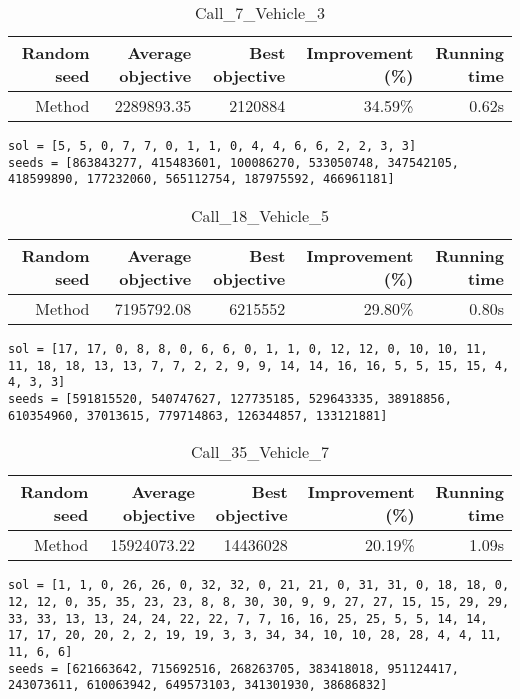 \begin{table}[ht]
\centering
\caption{Call\_7\_Vehicle\_3}
\label{tab:call7vehicle3}
\begin{tabular}{|r|r|r|r|r|}
Random seed & Average objective & Best objective & Improvement (\%) & Running time \\
\hline
Method & 2289893.35 & 2120884 & 34.59\% & 0.62s\\
\end{tabular}
\end{table}
\begin{lstlisting}[label={lst:call7vehicle3},caption=Optimal solution call\_7\_vehicle\_3]
sol = [5, 5, 0, 7, 7, 0, 1, 1, 0, 4, 4, 6, 6, 2, 2, 3, 3]
seeds = [863843277, 415483601, 100086270, 533050748, 347542105, 418599890, 177232060, 565112754, 187975592, 466961181]
\end{lstlisting}
\clearpage


\begin{table}[ht]
\centering
\caption{Call\_18\_Vehicle\_5}
\label{tab:call18vehicle5}
\begin{tabular}{|r|r|r|r|r|}
Random seed & Average objective & Best objective & Improvement (\%) & Running time \\
\hline
Method & 7195792.08 & 6215552 & 29.80\% & 0.80s\\
\end{tabular}
\end{table}
\begin{lstlisting}[label={lst:call18vehicle5},caption=Optimal solution call\_18\_vehicle\_5]
sol = [17, 17, 0, 8, 8, 0, 6, 6, 0, 1, 1, 0, 12, 12, 0, 10, 10, 11, 11, 18, 18, 13, 13, 7, 7, 2, 2, 9, 9, 14, 14, 16, 16, 5, 5, 15, 15, 4, 4, 3, 3]
seeds = [591815520, 540747627, 127735185, 529643335, 38918856, 610354960, 37013615, 779714863, 126344857, 133121881]
\end{lstlisting}
\clearpage


\begin{table}[ht]
\centering
\caption{Call\_35\_Vehicle\_7}
\label{tab:call35vehicle7}
\begin{tabular}{|r|r|r|r|r|}
Random seed & Average objective & Best objective & Improvement (\%) & Running time \\
\hline
Method & 15924073.22 & 14436028 & 20.19\% & 1.09s\\
\end{tabular}
\end{table}
\begin{lstlisting}[label={lst:call35vehicle7},caption=Optimal solution call\_35\_vehicle\_7]
sol = [1, 1, 0, 26, 26, 0, 32, 32, 0, 21, 21, 0, 31, 31, 0, 18, 18, 0, 12, 12, 0, 35, 35, 23, 23, 8, 8, 30, 30, 9, 9, 27, 27, 15, 15, 29, 29, 33, 33, 13, 13, 24, 24, 22, 22, 7, 7, 16, 16, 25, 25, 5, 5, 14, 14, 17, 17, 20, 20, 2, 2, 19, 19, 3, 3, 34, 34, 10, 10, 28, 28, 4, 4, 11, 11, 6, 6]
seeds = [621663642, 715692516, 268263705, 383418018, 951124417, 243073611, 610063942, 649573103, 341301930, 38686832]
\end{lstlisting}
\clearpage


